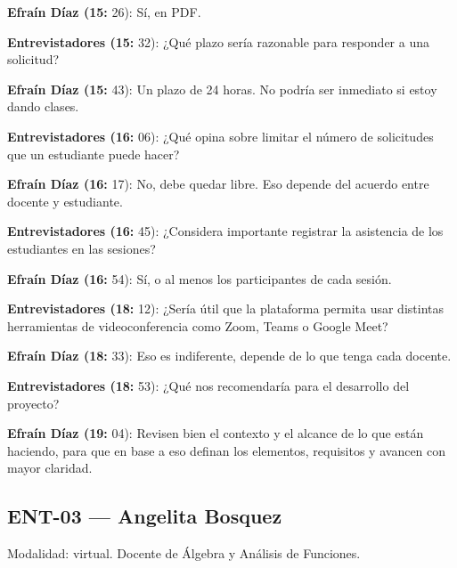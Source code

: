 \noindent\textbf{Efraín Díaz (15:} 26): Sí, en PDF.\par\smallskip

\noindent\textbf{Entrevistadores (15:} 32): ¿Qué plazo sería razonable para responder a una solicitud?\par\smallskip

\noindent\textbf{Efraín Díaz (15:} 43): Un plazo de 24 horas. No podría ser inmediato si estoy dando clases.\par\smallskip

\noindent\textbf{Entrevistadores (16:} 06): ¿Qué opina sobre limitar el número de solicitudes que un estudiante puede hacer?\par\smallskip

\noindent\textbf{Efraín Díaz (16:} 17): No, debe quedar libre. Eso depende del acuerdo entre docente y estudiante.\par\smallskip

\noindent\textbf{Entrevistadores (16:} 45): ¿Considera importante registrar la asistencia de los estudiantes en las sesiones?\par\smallskip

\noindent\textbf{Efraín Díaz (16:} 54): Sí, o al menos los participantes de cada sesión.\par\smallskip

\noindent\textbf{Entrevistadores (18:} 12): ¿Sería útil que la plataforma permita usar distintas herramientas de videoconferencia como Zoom, Teams o Google Meet?\par\smallskip

\noindent\textbf{Efraín Díaz (18:} 33): Eso es indiferente, depende de lo que tenga cada docente.\par\smallskip

\noindent\textbf{Entrevistadores (18:} 53): ¿Qué nos recomendaría para el desarrollo del proyecto?\par\smallskip

\noindent\textbf{Efraín Díaz (19:} 04): Revisen bien el contexto y el alcance de lo que están haciendo, para que en base a eso definan los elementos, requisitos y avancen con mayor claridad.\par\smallskip

\subsection{ENT-03 — Angelita Bosquez}
\label{transcripcion:ent03}

Modalidad: virtual. Docente de Álgebra y Análisis de Funciones.\par\smallskip

